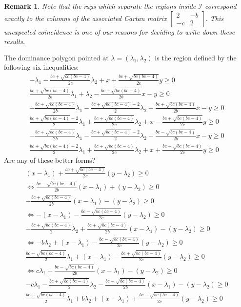 \documentclass{amsart}
\newtheorem{remark}[theorem]{Remark}
\numberwithin{theorem}{section}
\newcommand{\cI}{\mathcal{I}}
\begin{document}
  \begin{remark}
    Note that the rays which separate the regions inside $\cI$ correspond exactly to the columns of the associated Cartan matrix $\left[ \begin{array}{cc} 2 & -b \\ -c & 2 \end{array} \right]$.
    This unexpected coincidence is one of our reasons for deciding to write down these results.
  \end{remark}

  The dominance polygon pointed at $\lambda=(\lambda_1,\lambda_2)$ is the region defined by the following six inequalities:
  \begin{align}
    -\lambda_1-\frac{b c+\sqrt{b c (b c-4)}}{2 c}\lambda_2+x+\frac{b c+\sqrt{b c (b c-4)}}{2 c}y\geq0
    \\
    \frac{b c+\sqrt{b c (b c-4)}}{2 b}\lambda_1+\lambda_2-\frac{b c+\sqrt{b c (b c-4)}}{2 b}x-y\geq0
    \\
    -\frac{b c+\sqrt{b c (b c-4)}}{2 b}\lambda_1 - \frac{b c+\sqrt{b c (b c-4)}-2}{2}\lambda_2 + \frac{b c+\sqrt{b c (b c-4)}}{2 b}x-y\geq0
    \\
    \frac{b c+\sqrt{b c (b c-4)}-2}{2}\lambda_1+\frac{b c+\sqrt{b c (b c-4)}}{2 c}\lambda_2+x-\frac{b c+\sqrt{b c (b c-4)}}{2 c}y\geq0
    \\
    -\frac{b c+\sqrt{b c (b c-4)}}{2 b}\lambda_1-\frac{b c+\sqrt{b c (b c-4)}-2}{2}\lambda_2-\frac{b c-\sqrt{b c (b c-4)}}{2 b}x-y\geq0
    \\
    \frac{b c+\sqrt{b c (b c-4)}-2}{2}\lambda_1+\frac{b c+\sqrt{b c (b c-4)}}{2 c}\lambda_2+x+\frac{b c-\sqrt{b c (b c-4)}}{2 c}y\geq0
  \end{align}
  Are any of these better forms?
  \begin{align}
    (x-\lambda_1)+\frac{b c+\sqrt{b c (b c-4)}}{2 c}(y-\lambda_2)\geq0
    \\
    \nonumber \iff \frac{b c-\sqrt{b c (b c-4)}}{2 b}(x-\lambda_1)+(y-\lambda_2)\geq0
    \\
    -\frac{b c+\sqrt{b c (b c-4)}}{2 b}(x-\lambda_1)-(y-\lambda_2)\geq0
    \\
    \nonumber \iff -(x-\lambda_1)-\frac{b c-\sqrt{b c (b c-4)}}{2 c}(y-\lambda_2)\geq0
    \\
    -\frac{b c+\sqrt{b c (b c-4)}}{2}\lambda_2 + \frac{b c+\sqrt{b c (b c-4)}}{2 b}(x-\lambda_1)-(y-\lambda_2)\geq0
    \\
    \nonumber \iff -b\lambda_2 + (x-\lambda_1)-\frac{b c-\sqrt{b c (b c-4)}}{2 c}(y-\lambda_2)\geq0
    \\
    \frac{b c+\sqrt{b c (b c-4)}}{2}\lambda_1+(x-\lambda_1)-\frac{b c+\sqrt{b c (b c-4)}}{2 c}(y-\lambda_2)\geq0
    \\
    \nonumber \iff c\lambda_1+\frac{b c-\sqrt{b c (b c-4)}}{2 b}(x-\lambda_1)-(y-\lambda_2)\geq0
    \\
    -c\lambda_1-\frac{b c+\sqrt{b c (b c-4)}}{2}\lambda_2-\frac{b c-\sqrt{b c (b c-4)}}{2 b}(x-\lambda_1)-(y-\lambda_2)\geq0
    \\
    \frac{b c+\sqrt{b c (b c-4)}}{2}\lambda_1+b\lambda_2+(x-\lambda_1)+\frac{b c-\sqrt{b c (b c-4)}}{2 c}(y-\lambda_2)\geq0
  \end{align}
\end{document}
